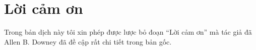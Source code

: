\documentclass[11pt]{book}
\begin{document}




\section*{Lời cảm ơn}

Trong bản dịch này tôi xin phép được lược bỏ đoạn ``Lời cảm ơn''
mà tác giả đã Allen B. Downey đã đề cập rất chi tiết trong bản gốc.












\end{document}
